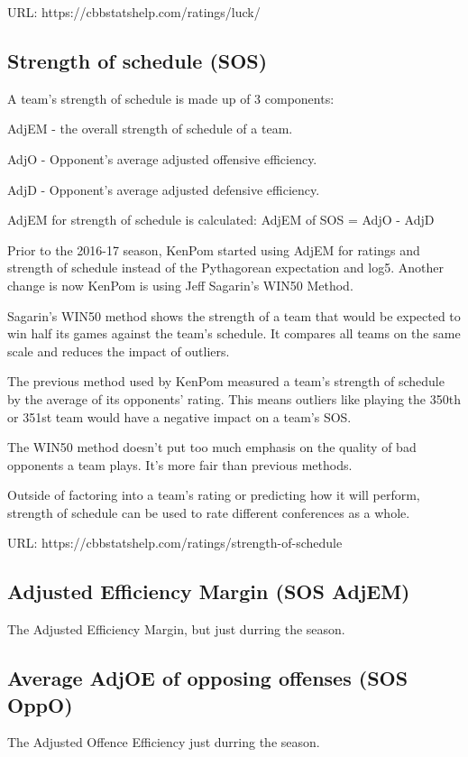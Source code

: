 \documentclass[
10pt, %
a4paper, %
oneside, %
headinclude,footinclude, %
BCOR5mm, %
]{scrartcl}
\begin{document}
\begin{description}
\begin{description}
URL: https://cbbstatshelp.com/ratings/luck/
\end{description}

\subsection{Strength of schedule (SOS)}
\begin{description}
A team's strength of schedule is made up of 3 components:
\item AdjEM - the overall strength of schedule of a team.
\item AdjO - Opponent's average adjusted offensive efficiency.
\item AdjD - Opponent's average adjusted defensive efficiency.

AdjEM for strength of schedule is calculated:
AdjEM of SOS = AdjO - AdjD

Prior to the 2016-17 season, KenPom started using AdjEM for ratings and strength of schedule instead of the Pythagorean expectation and log5.
Another change is now KenPom is using Jeff Sagarin's WIN50 Method.

Sagarin's WIN50 method shows the strength of a team that would be expected to win half its games against the team's schedule. It compares all teams on the same scale and reduces the impact of outliers.

The previous method used by KenPom measured a team's strength of schedule by the average of its opponents' rating. This means outliers like playing the 350th or 351st team would have a negative impact on a team's SOS.

The WIN50 method doesn't put too much emphasis on the quality of bad opponents a team plays. It's more fair than previous methods.

Outside of factoring into a team's rating or predicting how it will perform, strength of schedule can be used to rate different conferences as a whole.

URL: https://cbbstatshelp.com/ratings/strength-of-schedule
	\subsection{Adjusted Efficiency Margin (SOS AdjEM)}
	\begin{description}
		The Adjusted Efficiency Margin, but just durring the season.
	\end{description}
	
	\subsection{Average AdjOE of opposing offenses (SOS OppO)}
	\begin{description}
		The Adjusted Offence Efficiency just durring the season.
	\end{description}
	

\end{description}
\end{description}
\end{document}
